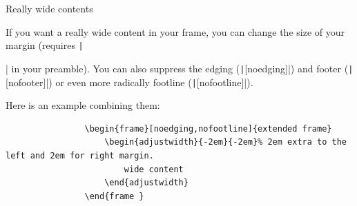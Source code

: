 \documentclass[aspectratio=169]{beamer}
\begin{document}
	\begin{frame}{Really wide contents}
		\begin{adjustwidth}{-2em}{-2em}
			If you want a really wide content in your frame, you can change the size of your margin (requires \texttt|\usepackage{changepage}| in your preamble).
			You can also suppress the edging (\texttt|[noedging]|) and footer (\texttt|[nofooter]|) or even more radically footline (\texttt|[nofootline]|).

			Here is an example combining them:
			\begin{verbatim}
				\begin{frame}[noedging,nofootline]{extended frame}
					\begin{adjustwidth}{-2em}{-2em}% 2em extra to the left and 2em for right margin.
						wide content
					\end{adjustwidth}
				\end{frame }
			\end{verbatim}
		\end{adjustwidth}
	\end{frame}
\end{document}
